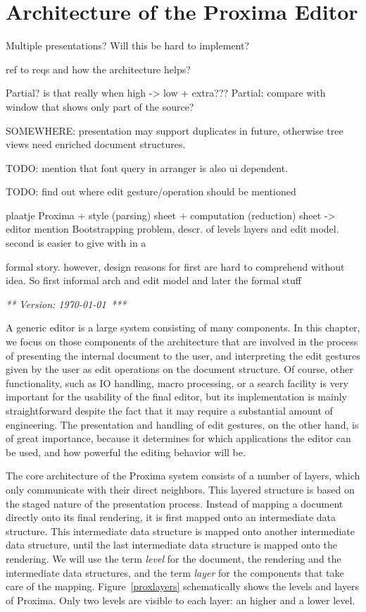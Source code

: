 \chapter{Architecture of the Proxima Editor}
\label{chap:proxArch}

\bc
Multiple presentations? Will this be hard to implement?

ref to reqs and how the architecture helps?

Partial? is that really when high -> low + extra???
Partial: compare with window that shows only part of the source?

SOMEWHERE: presentation may support duplicates in future, otherwise tree views need enriched 
 document structures.

TODO: mention that font query in arranger is also ui dependent.

TODO: find out where edit gesture/operation should be mentioned

plaatje Proxima + style (parsing) sheet + computation (reduction) sheet -> editor mention Bootstrapping problem, descr. of levels layers and edit model. second is easier to give with in a

formal story. however, design reasons for first are hard to comprehend without idea. So first informal arch 
 and edit model and later the formal stuff
\ec


{\em *** Version: \today~***}


A generic editor is a large system consisting of many components. In this chapter, we focus on those components of the architecture that are involved in the process of presenting the internal document to the user, and interpreting the edit gestures given by the user as edit operations on the document structure. Of course, other functionality, such as IO handling, macro processing, or a search facility is very important for the usability of the final editor, but its implementation is mainly straightforward despite the fact that it may require a substantial amount of engineering. The presentation and handling of edit gestures, on the other hand, is of great importance, because it determines for which applications the editor can be used, and how powerful the editing behavior will be.

The core architecture of the Proxima system consists of a number of layers, which only communicate with their direct neighbors. This layered structure is based on the staged nature of the presentation process. Instead of mapping a document directly onto its final rendering, it is first mapped onto an intermediate data structure. This intermediate data structure is mapped onto another intermediate data structure, until the last intermediate data structure is mapped onto the rendering. We will use the term {\em level} for the document, the rendering and the intermediate data structures, and the term {\em layer} for the components that take care of the mapping. Figure~\ref{proxlayers} schematically shows the levels and layers of Proxima. Only two levels are visible to each layer: an higher and a lower level.

